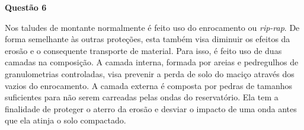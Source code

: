 \item[]\textbf{Questão 6}

\hspace{1cm} Nos taludes de montante normalmente é feito uso do enrocamento ou \textit{rip-rap}. De forma semelhante às outras proteções, esta também visa diminuir os efeitos da erosão e o consequente transporte de material. Para isso, é feito uso de duas camadas na composição. A camada interna, formada por areias e pedregulhos de granulometrias controladas, visa prevenir a perda de solo do maciço através dos vazios do enrocamento. A camada externa é composta por pedras de tamanhos suficientes para não serem carreadas pelas ondas do reservatório. Ela tem a finalidade de proteger o aterro da erosão e desviar o impacto de uma onda antes que ela atinja o solo compactado.